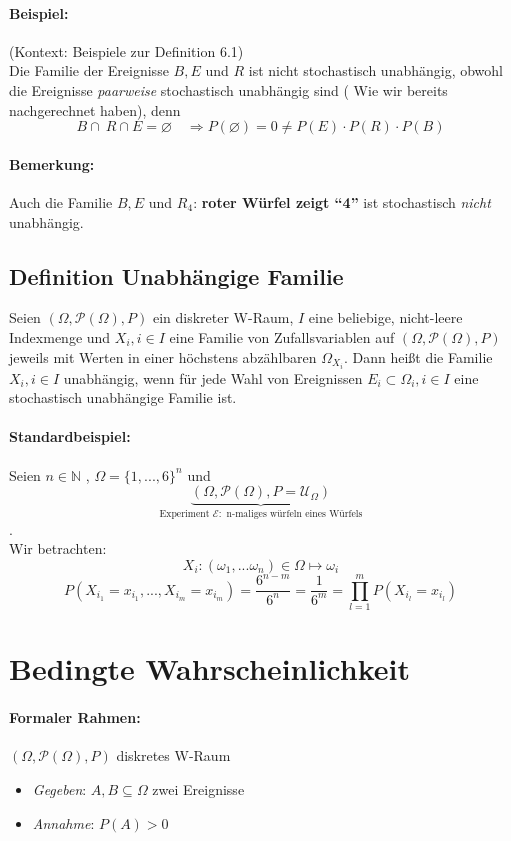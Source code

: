 \documentclass[12pt,a4paper]{article}
\begin{document}
 	\paragraph{Beispiel:}
 	(Kontext: Beispiele zur Definition 6.1)\\
 	Die Familie der Ereignisse $B,E$ und $R$ ist nicht stochastisch unabhängig, obwohl die Ereignisse \textit{paarweise} stochastisch unabhängig sind ( Wie wir bereits nachgerechnet haben), denn
 	$$B\cap\ R\cap E=\varnothing \quad \Rightarrow P(\varnothing )=0\neq P(E)\cdot P(R)\cdot P(B)$$
 	\paragraph{Bemerkung:}
 	Auch die Familie $B,E$ und $R_4$: \textbf{roter Würfel zeigt ``4''} ist stochastisch \textit{nicht} unabhängig.
 	
 	\subsection{Definition Unabhängige Familie}
 	Seien $(\Omega,\mathcal{P}(\Omega),P)$ ein diskreter W-Raum, $I$ eine beliebige, nicht-leere Indexmenge und $X_i ,i\in I$ eine Familie von Zufallsvariablen auf $(\Omega,\mathcal{P}(\Omega),P)$ jeweils mit Werten in einer höchstens abzählbaren
 	$\Omega_{X_i}$. Dann heißt die Familie $X_i ,i\in I$ unabhängig, wenn für jede Wahl von Ereignissen $E_i \subset\Omega_i , i\in I$ eine stochastisch unabhängige Familie ist.
 	\paragraph{Standardbeispiel:}
 	Seien $n\in\mathbb{N}$ , $\Omega=\{1,...,6\}^n$ und  	
 	$$\underbrace{(\Omega,\mathcal{P}(\Omega),P=\mathcal{U}_{\Omega})}_{\text{Experiment } \mathcal{E}: \text{ n-maliges würfeln eines Würfels}} $$. \\
 	Wir betrachten:
 	$$X_i : (\omega_1,...\omega_n)\in\Omega\longmapsto\omega_i$$
 	$$P(X_{i_1}=x_{i_1},...,X_{i_m}=x_{i_m})=\frac{6^{n-m}}{6^n}=\frac{1}{6^m}=
 	\prod^m_{l=1}P(X_{i_l}=x_{i_l})$$
 	\section{Bedingte Wahrscheinlichkeit}
 	\paragraph{Formaler Rahmen:}
 	$(\Omega,\mathcal{P}(\Omega),P)$ diskretes W-Raum
 	\begin{itemize}
 	\item[] \emph{Gegeben}: $A,B\subseteq\Omega$ zwei Ereignisse
 	\item[] \emph{Annahme}: $P(A)>0$
 	\end{itemize}
 	 	
\end{document}
